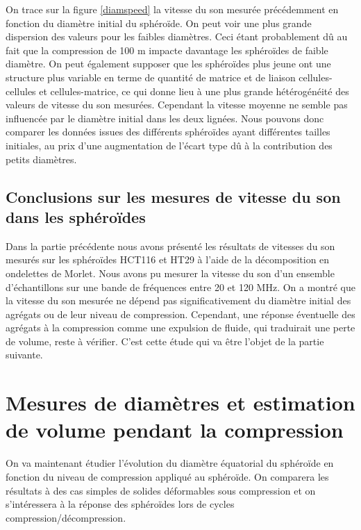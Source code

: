 On trace sur la figure \ref{diamspeed} la vitesse du son mesurée précédemment en fonction du diamètre initial du sphéroïde. On peut voir une plus grande dispersion des valeurs pour les faibles diamètres. Ceci étant probablement dû au fait que la compression de 100 \textmu m impacte davantage les sphéroïdes de faible diamètre. On peut également supposer que les sphéroïdes plus jeune ont une structure plus variable en terme de quantité de matrice et de liaison cellules-cellules et cellules-matrice, ce qui donne lieu à une plus grande hétérogénéité des valeurs de vitesse du son mesurées. Cependant la vitesse moyenne ne semble pas influencée par le diamètre initial dans les deux lignées. Nous pouvons donc comparer les données issues des différents sphéroïdes ayant différentes tailles initiales, au prix d'une augmentation de l'écart type dû à la contribution des petits diamètres.

\subsection{Conclusions sur les mesures de vitesse du son dans les sphéroïdes}
 Dans la partie précédente nous avons présenté les résultats de vitesses du son mesurés sur les sphéroïdes HCT116 et HT29 à l'aide de la décomposition en ondelettes de Morlet. Nous avons pu mesurer la vitesse du son d'un ensemble d'échantillons sur une bande de fréquences entre 20 et 120 MHz. On a  montré que la vitesse du son mesurée ne dépend pas significativement du diamètre initial des agrégats ou de leur niveau de compression. Cependant, une réponse éventuelle des agrégats à la compression comme une expulsion de fluide, qui traduirait une perte de volume, reste à vérifier. C'est cette étude qui va être l'objet de la partie suivante.


\section[Mesures diamètres et volume pendant compression]{Mesures de  diamètres et estimation de volume pendant la compression%
              }

 On va maintenant étudier l'évolution du diamètre équatorial du sphéroïde en fonction du niveau de compression appliqué au sphéroïde. On comparera les résultats à des cas simples de solides déformables sous compression et on s'intéressera à la réponse des sphéroïdes lors de cycles compression/décompression.

